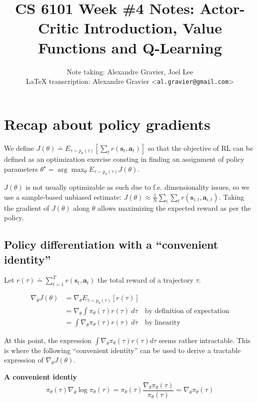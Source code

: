 \documentclass{article}
\title{CS 6101 Week \#4 Notes: Actor-Critic Introduction, Value Functions and Q-Learning}
\author{
  Note taking: Alexandre Gravier, Joel Lee\\
  \LaTeX{} transcription: Alexandre Gravier <\texttt{al.gravier@gmail.com}> \\
}
\begin{document}
\maketitle

\tableofcontents

\section{Recap about policy gradients}


We define $J(\theta) \doteq E_{\tau\sim p_\theta(\tau)}\left[\sum_t r\left(\mathbf{s}_t,\mathbf{a}_t\right)\right]$ so that the objective of RL can be defined as an optimization exercise consting in finding an assignment of policy parameters $\theta^\star = \arg\max_\theta E_{\tau\sim p_\theta(\tau)}J(\theta)$.

$J(\theta)$ is not usually optimizable as such due to f.e. dimensionality issues, so we
use a sample-based unbiased estimate: $J(\theta) \approx \frac{1}{N} \sum_i \sum_t r\left(\mathbf{s}_{i,t},\mathbf{a}_{i,t}\right)$. Taking the gradient of $J(\theta)$ along $\theta$ allows maximizing the expected reward as per the policy.

\subsection{Policy differentiation with a ``convenient identity''}

Let $r(\tau) \doteq \sum_{t=1}^T r\left(\mathbf{s}_t,\mathbf{a}_t\right)$ the total reward of a trajectory $\tau$.

\begin{subequations}
  \begin{align}
    \nabla_\theta J(\theta) 
      &= \nabla_\theta E_{\tau\sim p_\theta(\tau)}[r(\tau)] & \\
      &= \nabla_\theta\int\pi_\theta(\tau) r(\tau)\ d\tau &\text{by definition of expectation}\\ 
      &= \int\nabla_\theta\pi_\theta(\tau) r(\tau)\ d\tau &\text{by linearity} \label{eq:gradjintegral}
  \end{align}
\end{subequations}

At this point, the expression $\int\nabla_\theta\pi_\theta(\tau) r(\tau)d\tau$ seems rather intractable. This is where the following ``convenient identity'' can be used to derive a tractable expression of $\nabla_\theta J(\theta)$.

\begin{shaded}
  \textbf{A convenient identiy}
  \begin{equation} \label{eq:convenientidentity}
    \pi_\theta (\tau)\nabla_\theta \log \pi_\theta (\tau) = \pi_\theta (\tau) \frac{\nabla_\theta \pi_\theta (\tau)}{\pi_\theta (\tau)} = \nabla_\theta \pi_\theta (\tau)
  \end{equation}
\end{shaded}
\end{document}
